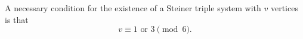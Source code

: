 A necessary condition for the existence of a Steiner triple system with $v$ vertices is that
$$v \equiv 1 \text{ or } 3 \pmod{6}.$$
